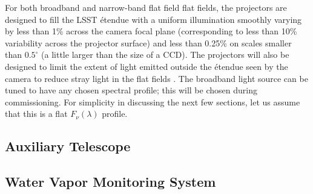 \documentclass[12pt,preprint]{aastex}
\begin{document}
For both broadband and narrow-band flat field flat fields, the
projectors are designed to fill the LSST \'{e}tendue with a uniform
illumination smoothly varying by less than 1\% across the camera focal
plane (corresponding to less than 10\% variability across the
projector surface) and less than 0.25\% on scales smaller than
$0.5^{\circ}$ (a little larger than the size of a CCD). The projectors
will also be designed to limit the extent of light emitted outside the
\'{e}tendue seen by the camera to reduce stray light in the flat
fields \citep{Gressler2010}. The broadband light source can be tuned
to have any chosen spectral profile; this will be chosen during
commissioning. For simplicity in discussing the next few sections, let
us assume that this is a flat $F_\nu(\lambda)$ profile.

\subsection{Auxiliary Telescope}

\subsection{Water Vapor Monitoring System}
\end{document}
